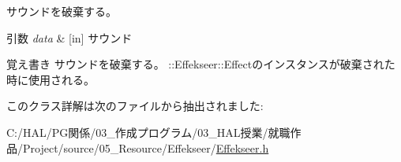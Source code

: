 サウンドを破棄する。 


\begin{DoxyParams}{引数}
{\em data} & \mbox{[}in\mbox{]} サウンド \\
\hline
\end{DoxyParams}
\begin{DoxyNote}{覚え書き}
サウンドを破棄する。 \+::\+Effekseer\+::\+Effectのインスタンスが破棄された時に使用される。 
\end{DoxyNote}


このクラス詳解は次のファイルから抽出されました\+:\begin{DoxyCompactItemize}
\item 
C\+:/\+H\+A\+L/\+P\+G関係/03\+\_\+作成プログラム/03\+\_\+\+H\+A\+L授業/就職作品/\+Project/source/05\+\_\+\+Resource/\+Effekseer/\mbox{\hyperlink{_effekseer_8h}{Effekseer.\+h}}\end{DoxyCompactItemize}
